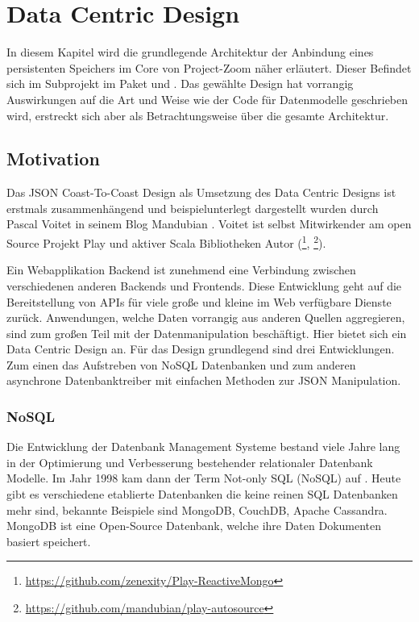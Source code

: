 \chapter{Data Centric Design}
\label{sec:dcd}
In diesem Kapitel wird die grundlegende Architektur der Anbindung eines persistenten Speichers im Core von Project-Zoom näher erläutert. Dieser Befindet sich im  Subprojekt im Paket  und . Das gewählte Design hat vorrangig Auswirkungen auf die Art und Weise wie der Code für Datenmodelle geschrieben wird, erstreckt sich aber als Betrachtungsweise über die gesamte Architektur.

\section{Motivation}
\label{sec:dcdmotivation}
Das JSON Coast-To-Coast Design als Umsetzung des Data Centric Designs ist erstmals zusammenhängend und beispielunterlegt dargestellt wurden durch Pascal Voitet in seinem Blog Mandubian \cite{jctc}. Voitet ist selbst Mitwirkender am open Source Projekt Play und aktiver Scala Bibliotheken Autor (\footnote{\url{ https://github.com/zenexity/Play-ReactiveMongo}}, \footnote{\url{ https://github.com/mandubian/play-autosource}}). 

Ein Webapplikation Backend ist zunehmend eine Verbindung zwischen verschiedenen anderen Backends und Frontends. Diese Entwicklung geht auf die Bereitstellung von APIs für viele große und kleine im Web verfügbare Dienste zurück. Anwendungen, welche Daten vorrangig aus anderen Quellen aggregieren, sind zum großen Teil mit der Datenmanipulation beschäftigt. Hier bietet sich ein Data Centric Design an. Für das Design grundlegend sind drei Entwicklungen. Zum einen das Aufstreben von NoSQL Datenbanken und zum anderen asynchrone Datenbanktreiber mit einfachen Methoden zur JSON Manipulation.

\subsection{NoSQL}
Die Entwicklung der Datenbank Management Systeme bestand viele Jahre lang in der Optimierung und Verbesserung bestehender relationaler Datenbank Modelle. Im Jahr 1998 kam dann der Term Not-only SQL (NoSQL) auf \cite{storage-solutions}. Heute gibt es verschiedene etablierte Datenbanken die keine reinen SQL Datenbanken mehr sind, bekannte Beispiele sind MongoDB, CouchDB, Apache Cassandra. MongoDB ist eine Open-Source Datenbank, welche ihre Daten Dokumenten basiert speichert.


